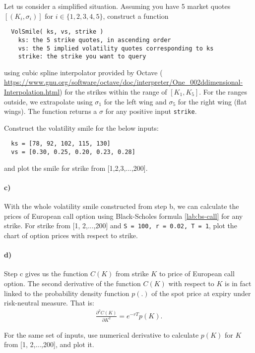 \documentclass[11pt,a4paper,hidelinks,fleqn]{article}            %
\begin{document}
Let us consider a simplified situation. 
Assuming you have 5 market quotes $[(K_i, \sigma_i)]$ for $i\in\{1, 2, 3, 4, 5\}$,
construct a function 
\vspace{-0.6cm}
\begin{verbatim}
  VolSmile( ks, vs, strike )
    ks: the 5 strike quotes, in ascending order
    vs: the 5 implied volatility quotes corresponding to ks
    strike: the strike you want to query
\end{verbatim}
\vspace{-0.6cm}
using cubic spline interpolator provided by Octave (
\url{https://www.gnu.org/software/octave/doc/interpreter/One_002ddimensional-Interpolation.html})
for the strikes within the range of $[K_1, K_5]$. For the ranges outside, we extrapolate using $\sigma_1$ for the left wing and $\sigma_5$ for the right wing (flat wings).
The function returns a $\sigma$ for any positive input \verb=strike=.

Construct the volatility smile for the below inputs:
\begin{verbatim}
  ks = [78, 92, 102, 115, 130]
  vs = [0.30, 0.25, 0.20, 0.23, 0.28]
\end{verbatim}
and plot the smile for strike from [1,2,3,...,200].

\paragraph{c)}
With the whole volatility smile constructed from step b, we can 
calculate the prices of European call option using Black-Scholes formula \eqref{lab:bs-call} for any strike.
For strike from [1, 2,...,200] and
\verb_S = 100, r = 0.02, T = 1_,
plot the chart of option prices with respect to strike.

\paragraph{d)}
Step c gives us the function $C(K)$ from strike $K$ to price of European call option.
The second derivative of the function $C(K)$ with respect to $K$ is in fact linked to
the probability density function $p(.)$ of the spot price at expiry under risk-neutral measure.
That is:
\begin{align*}
\frac{\partial^2 C(K)}{\partial K^2} = e^{-rT} p(K).
\end{align*}

For the same set of inputs, use numerical derivative to calculate $p(K)$ for $K$ from [1, 2,...,200], and plot it.
\end{document}
